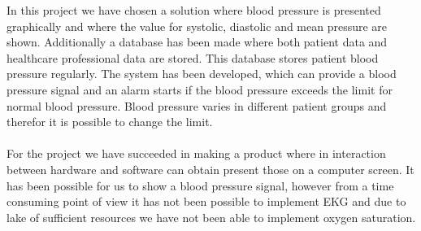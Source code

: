 In this project we have chosen a solution where blood pressure is presented graphically and where the value for systolic, diastolic and mean pressure are shown. Additionally a database has been made where both patient data and healthcare professional data are stored. This database stores patient blood pressure regularly. The system has been developed, which can provide a blood pressure signal and an alarm starts if the blood pressure exceeds the limit for normal blood pressure. Blood pressure varies in different patient groups and therefor it is possible to change the limit. \\\\
For the project we have succeeded in making a product where in interaction between hardware and software can obtain present those on a computer screen. 
It has been possible for us to show a blood pressure signal, however from a time consuming point of view it has not been possible to implement EKG and due to lake of sufficient resources we have not been able to implement oxygen saturation.  
